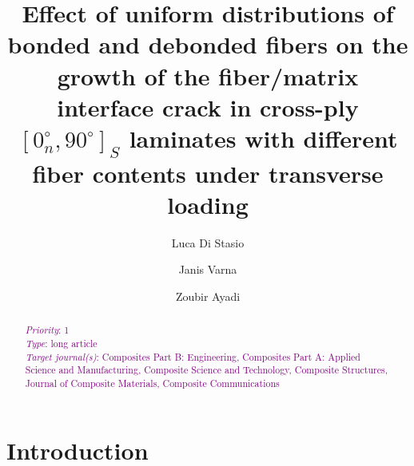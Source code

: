\documentclass[review]{elsarticle}
\begin{document}
\begin{frontmatter}

\title{Effect of uniform distributions of bonded and debonded fibers on the growth of the fiber/matrix interface crack in cross-ply $\left[0^{\circ}_{n},90^{\circ}\right]_{S}$ laminates with different fiber contents under transverse loading}


\author[nancy,lulea]{Luca Di Stasio}
\author[lulea]{Janis Varna}
\author[nancy]{Zoubir Ayadi}


\address[nancy]{Universit\'e de Lorraine, EEIGM, IJL, 6 Rue Bastien Lepage, F-54010 Nancy, France}
\address[lulea]{Lule\aa\ University of Technology, University Campus, SE-97187 Lule\aa, Sweden}

\begin{abstract}
\noindent
\textcolor{purple}{{\em Priority}: 1}\\
\textcolor{purple}{{\em Type}: long article}\\
\textcolor{purple}{{\em Target journal(s)}: Composites Part B: Engineering, Composites Part A: Applied Science and Manufacturing, Composite Science and Technology, Composite Structures, Journal of Composite Materials, Composite Communications}\\

\end{abstract}


\end{frontmatter}

\linenumbers

\section{Introduction}
\end{document}

